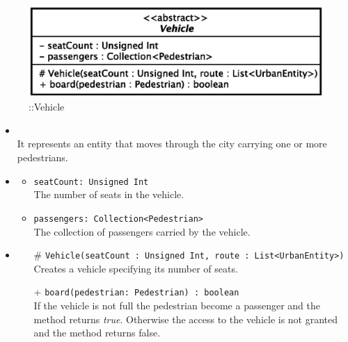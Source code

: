 \begin{figure}[h]
\centering
\includegraphics[scale=0.6,keepaspectratio]{images/solution/app/backend/vehicle.eps}
\caption{\pActive::Vehicle}
\label{fig:sd-app-vehicle}
\end{figure}
\FloatBarrier
\begin{itemize}
  \item \textbf{\descr} \\
    It represents an entity that moves through the city carrying one or more
pedestrians.
  \item \textbf{\attrs}
  \begin{itemize}
    \item \texttt{seatCount: Unsigned Int} \\
The number of seats in the vehicle.
    \item \texttt{passengers: Collection<Pedestrian>} \\
The collection of passengers carried by the vehicle.
  \end{itemize}
  \item \textbf{\ops}
  \begin{itemize} 
    \item[\#] \texttt{Vehicle(seatCount : Unsigned Int, route : List<UrbanEntity>)} \\
Creates a vehicle specifying its number of seats.
    \item[+] \texttt{board(pedestrian: Pedestrian) : boolean} \\
If the vehicle is not full the pedestrian become a passenger and the method 
returns \textit{true}. Otherwise the access to the vehicle is not granted and 
the method returns false.
  \end{itemize}
\end{itemize}
